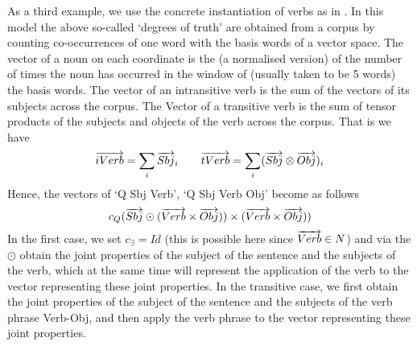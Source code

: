 As a third example, we  use the  concrete instantiation  of verbs as in \cite{GrefenSadr}. In this model the above so-called `degrees of truth' are obtained from a corpus by counting co-occurrences of one word with the basis words of a vector space. The vector of a noun on each coordinate is the (a normalised version) of the  number of times the noun has occurred in the window of (usually taken to be 5 words) the basis words. The vector of an intransitive verb is the sum of the vectors of its subjects across the corpus. The Vector of a transitive verb is the sum of tensor products of the subjects and objects of the verb across the corpus. That is we have
\[
\overrightarrow{iVerb} = \sum_i \overrightarrow{Sbj}_i
\qquad
\overrightarrow{tVerb} = \sum_i (\overrightarrow{Sbj} \otimes \overrightarrow{Obj})_i
\]
Hence, the vectors of `Q Sbj Verb', `Q Sbj Verb Obj'  become as follows
\[
c_Q(\overrightarrow{Sbj} \odot (\overrightarrow{Verb} \times \overrightarrow{Obj})) \times   (\overrightarrow{Verb} \times \overrightarrow{Obj}))\\
\]
In the first case, we set  $c_{\exists} = Id$  (this is possible here since $\overrightarrow{Verb} \in N$) and  via the $\odot$ obtain the joint properties of the subject of the sentence and the subjects of the verb, which at the same time will represent the application of the verb to the vector representing these joint properties. In the transitive case, we first obtain the joint properties of the subject of the sentence and the subjects of the verb phrase Verb-Obj, and then apply the verb phrase to the vector representing these joint properties. 





